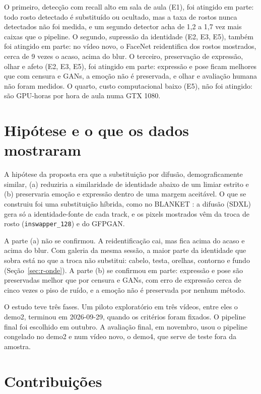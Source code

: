 O primeiro, detecção com recall alto em sala de aula (E1), foi atingido em parte: todo rosto detectado é substituído ou ocultado, mas a taxa de rostos nunca detectados não foi medida, e um segundo detector acha de 1,2 a 1,7 vez mais caixas que o pipeline. O segundo, supressão da identidade (E2, E3, E5), também foi atingido em parte: no vídeo novo, o FaceNet reidentifica  dos rostos mostrados, cerca de 9 vezes o acaso, acima do blur. O terceiro, preservação de expressão, olhar e afeto (E2, E3, E5), foi atingido em parte: expressão e pose ficam melhores que com censura e GANs, a emoção não é preservada, e olhar e avaliação humana não foram medidos. O quarto, custo computacional baixo (E5), não foi atingido: são  GPU-horas por hora de aula numa GTX 1080.

\section{Hipótese e o que os dados mostraram}

A hipótese da proposta era que a substituição por difusão, demograficamente similar, (a) reduziria a similaridade de identidade abaixo de um limiar estrito e (b) preservaria emoção e expressão dentro de uma margem aceitável. O que se construiu foi uma substituição híbrida, como no BLANKET \citep{blanket}: a difusão (SDXL) gera só a identidade-fonte de cada track, e os pixels mostrados vêm da troca de rosto (\texttt{inswapper\_128}) e do GFPGAN.

A parte (a) não se confirmou. A reidentificação cai, mas fica acima do acaso e acima do blur. Com galeria da mesma sessão, a maior parte da identidade que sobra está no que a troca não substitui: cabelo, testa, orelhas, contorno e fundo (Seção~\ref{sec:r-onde}). A parte (b) se confirmou em parte: expressão e pose são preservadas melhor que por censura e GANs, com erro de expressão cerca de cinco vezes o piso de ruído, e a emoção não é preservada por nenhum método.

O estudo teve três fases. Um piloto exploratório em três vídeos, entre eles o demo2, terminou em 2026-09-29, quando os critérios foram fixados. O pipeline final foi escolhido em outubro. A avaliação final, em novembro, usou o pipeline congelado no demo2 e num vídeo novo, o demo4, que serve de teste fora da amostra.

\section{Contribuições}

